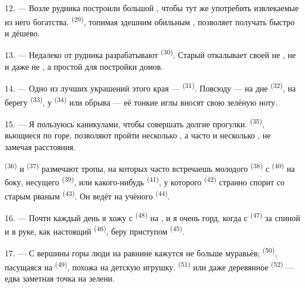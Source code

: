 12. --- Возле рудника построили большой , чтобы
тут же употребить извлекаемые из него богатства. 
\textsuperscript{(29)}, топимая здешним обильным , позволяет
получать  быстро и дёшево.

13. --- Недалеко от рудника разрабатывают 
\textsuperscript{(30)}. Старый  откалывает своей 
не , не  и даже не , а простой
 для постройки домов.

14. --- Одно из лучших украшений этого края --- 
\textsuperscript{(31)}. Повсюду --- на дне  \textsuperscript{(32)}, на
берегу  \textsuperscript{(33)}, у 
\textsuperscript{(34)} или обрыва --- её тонкие иглы вносят свою зелёную ноту.

\VUsaut{3.0mm}
\VUsaut{3.0mm}

15. --- Я пользуюсь каникулами, чтобы совершать долгие прогулки.
 \textsuperscript{(35)}, вьющиеся по горе, позволяют пройти
несколько , а часто и несколько , не
замечая расстояния.

 \textsuperscript{(36)} и 
\textsuperscript{(37)} размечают тропы, на которых часто встречаешь молодого
 \textsuperscript{(38)} с  \textsuperscript{(40)} на
боку, несущего  \textsuperscript{(39)}, или какого-нибудь
 \textsuperscript{(41)}, у которого 
\textsuperscript{(42)} странно спорит со старым рваным 
\textsuperscript{(43)}. Он ведёт на  учёного 
\textsuperscript{(44)}.

\VUsaut{3.0mm}

16. --- Почти каждый день я хожу с  \textsuperscript{(48)}
на , и я очень горд, когда с 
\textsuperscript{(47)} за спиной и  в руке, как настоящий
 \textsuperscript{(46)}, беру приступом 
\textsuperscript{(45)}.

17. --- С вершины горы люди на равнине кажутся не больше муравьёв;
 \textsuperscript{(50)}, пасущаяся на 
\textsuperscript{(49)}, похожа на детскую игрушку. 
\textsuperscript{(51)} или даже деревянное  \textsuperscript{(52)} --- едва
заметная точка на зелени.

